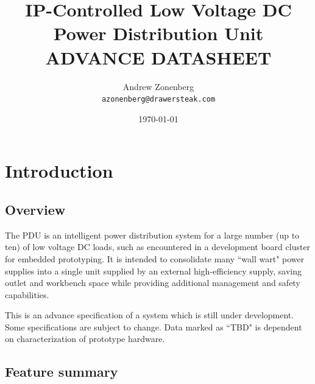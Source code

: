 \documentclass{article}
\begin{document}
\title{IP-Controlled Low Voltage DC\\Power Distribution Unit\\ADVANCE DATASHEET}
\author{Andrew Zonenberg\\
	\texttt{azonenberg@drawersteak.com}}
\date{\today}
\maketitle

\pagestyle{fancy}

\setcounter{tocdepth}{3}
\tableofcontents

\pagebreak
\section{Introduction}

\subsection{Overview}
The PDU is an intelligent power distribution system for a large number (up to ten) of low voltage DC loads, such as 
encountered in a development board cluster for embedded prototyping. It is intended to consolidate many ``wall wart" 
power supplies into a single unit supplied by an external high-efficiency supply, saving outlet and workbench space 
while providing additional management and safety capabilities.

This is an advance specification of a system which is still under development. Some specifications are subject to 
change. Data marked as ``TBD" is dependent on characterization of prototype hardware.

\subsection{Feature summary}
\end{document}
